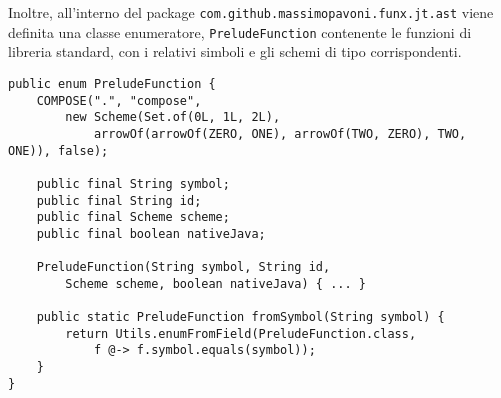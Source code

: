 Inoltre, all'interno del package \texttt{com.github.massimopavoni.funx.jt.ast} viene definita una classe enumeratore,
\texttt{PreludeFunction} contenente le funzioni di libreria standard, con i relativi simboli e gli schemi di tipo corrispondenti.

\vspace{4mm}
\begin{lstlisting}[caption={Parte del codice di \texttt{PreludeFunction}}, style=javaCode, label={lst:5-6-preludefunction-java}]
public enum PreludeFunction {
    COMPOSE(".", "compose",
        new Scheme(Set.of(0L, 1L, 2L),
            arrowOf(arrowOf(ZERO, ONE), arrowOf(TWO, ZERO), TWO, ONE)), false);

    public final String symbol;
    public final String id;
    public final Scheme scheme;
    public final boolean nativeJava;

    PreludeFunction(String symbol, String id,
        Scheme scheme, boolean nativeJava) { ... }

    public static PreludeFunction fromSymbol(String symbol) {
        return Utils.enumFromField(PreludeFunction.class,
            f @-> f.symbol.equals(symbol));
    }
}
\end{lstlisting}

\newpage

